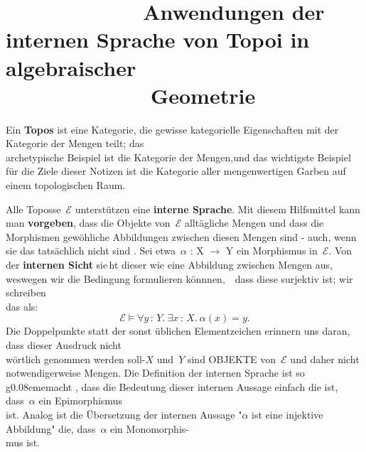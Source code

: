\documentclass{article}
\begin{document}
\raggedright
\color{grey}
\newcommand{\hilight}[1]{\textbf{#1}}

\section{\selectfont\ \ \ \ \ \ \ \ \ \ \ \ Anwendungen der internen Sprache von Topoi in algebraischer ~{\ \ \ \ \ \ \ \ } \mbox{\ \ \ \ \ \ \ \ \ \ \ \ } Geometrie}

Ein \hilight{Topos} ist eine Kategorie, die gewisse kategorielle Eigenschaften mit der
Kategorie der Mengen teilt; das \\ archetypische Beispiel ist die Kategorie der
Mengen,und das wichtigste Beispiel für die Ziele dieser Notizen ist die
Kategorie aller mengenwertigen Garben auf einem topologischen Raum.

Alle Toposse~$\mathcal{E}$ unterstützen eine \hilight{interne Sprache}. Mit diesem
Hilfsmittel kann man \hilight{vorgeben}, dass die Objekte von~$\mathcal{E}$
alltägliche Mengen und dass die Morphismen gewöhliche Abbildungen zwischen
diesen Mengen sind - auch, wenn sie das tatsächlich nicht sind . Sei
etwa~$\alpha$ : X $\to$ Y ein Morphismus in~$\mathcal{E}$. Von der \hilight{internen
Sicht} sie\,ht dieser wie eine Abbildung zwischen Mengen aus, weswegen wir die
Bedingung formulieren könnnen,\ \ dass diese surjektiv ist; wir schreiben \\ das als:
\[ \mathcal{E} \models \forall y\,{:}\,Y.\ \exists x\,{:}\,X.\ \alpha(x) = y. \]
Die Doppelpunkte statt der sonst üblichen Elementzeichen erinnern uns daran,
dass dieser Ausdruck nicht \\ wörtlich genommen werden soll-$X$ und~$Y$ sind
OBJEKTE von~$\mathcal{E}$ und daher nicht notwendigerweise Mengen.
Die Definition der internen Sprache ist so g\kern0.08ememacht , dass die Bedeutung dieser
internen Aus$\!$sage einfach die ist, dass~$\alpha$ ein Epimorphismus \\ ist.
Analog ist die Übersetzung der internen Aussage "$\alpha$ ist eine injektive
Abbildung" die, dass~$\alpha$ ein Monomorphis- \\ mus ist.
\end{document}

